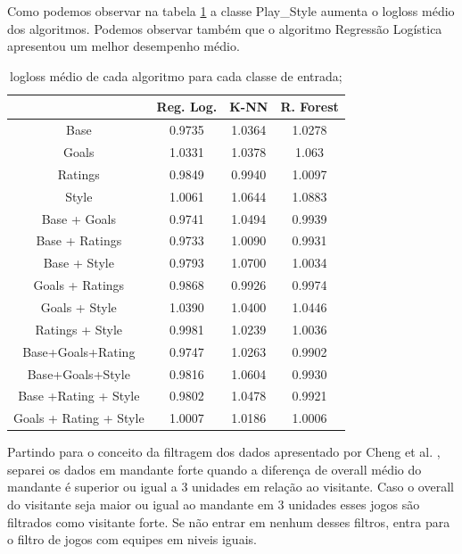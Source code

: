 \documentclass{article}
\begin{document}
Como podemos observar na tabela \ref{tab:comb} a classe Play\_Style aumenta o logloss médio dos algoritmos. Podemos observar também que o algoritmo Regressão Logística apresentou um melhor desempenho médio.
\begin{table}[!h]
	\centering
	\caption{logloss médio de cada algoritmo para cada classe de entrada;}
	\label{tab:comb}
	\begin{tabular}{c|c|c|c}
		& Reg. Log. & K-NN   & R. Forest \\ \hline
		Base                   & 0.9735    & 1.0364 & 1.0278    \\ \hline
		Goals                  & 1.0331    & 1.0378 & 1.063     \\ \hline
		Ratings                & 0.9849    & 0.9940 & 1.0097    \\ \hline
		Style                  & 1.0061     & 1.0644 & 1.0883    \\ \hline
		Base + Goals           & 0.9741    & 1.0494 & 0.9939    \\ \hline
		Base + Ratings         & 0.9733    & 1.0090 & 0.9931    \\ \hline
		Base + Style           & 0.9793    & 1.0700  & 1.0034    \\ \hline
		Goals + Ratings        & 0.9868    & 0.9926 & 0.9974    \\ \hline
		Goals + Style          & 1.0390    & 1.0400 & 1.0446    \\ \hline
		Ratings + Style        & 0.9981    & 1.0239 & 1.0036    \\ \hline
		Base+Goals+Rating      & 0.9747    & 1.0263 & 0.9902    \\ \hline
		Base+Goals+Style       & 0.9816    & 1.0604 & 0.9930    \\ \hline
		Base +Rating + Style   & 0.9802    & 1.0478 & 0.9921    \\ \hline
		Goals + Rating + Style & 1.0007    & 1.0186 & 1.0006   
	\end{tabular}
\end{table}

Partindo para o conceito da filtragem dos dados apresentado por Cheng et al. \cite{cheng2003new}, separei os dados em mandante forte quando a diferença de overall médio do mandante é superior ou igual a 3 unidades em relação ao visitante. Caso o overall do visitante seja maior ou igual ao mandante em 3 unidades esses jogos são filtrados como visitante forte. Se não entrar em nenhum desses filtros, entra para o filtro de jogos com equipes em niveis iguais.
\end{document}
